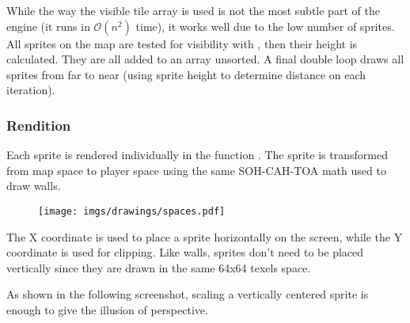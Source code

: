 \par
\begin{minipage}{\textwidth}
 
 \end{minipage}
 \par

While the way the visible tile array is used is not the most subtle part of the engine (it runs in $\mathcal{O}(n^2)$ time), it works well due to the low number of sprites. All sprites on the map are tested for visibility with , then their height is calculated. They are all added to an array unsorted. A final double loop draws all sprites from far to near (using sprite height to determine distance on each iteration).\\ 




\subsubsection{Rendition}
Each sprite is rendered individually in the function . The sprite is transformed from map space to player space using the same SOH-CAH-TOA math used to draw walls.

\par
\begin{figure}[H]
\centering
 \texttt{[image: imgs/drawings/spaces.pdf]}
 \end{figure}
\par
The X coordinate is used to place a sprite horizontally on the screen, while the Y coordinate is used for clipping. Like walls, sprites don't need to be placed vertically since they are drawn in the same 64x64 texels space.\\
\par
  \begin{minipage}{.5\textwidth}
  \end{minipage}
   \begin{minipage}{.5\textwidth} 
   \end{minipage}

\par



 As shown in the following screenshot, scaling a vertically centered sprite is enough to give the illusion of perspective.\\
\par
\begin{figure}[H]
 \centering
\end{figure}

